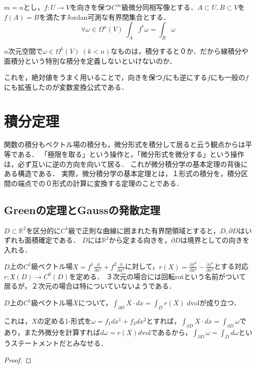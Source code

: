 \documentclass[uplatex, dvipdfmx]{jsreport}
\begin{document}
\begin{proposition}[変数変換公式]
    $m=n$とし，$f:U\to V$を向きを保つ$C^\infty$級微分同相写像とする．$A\subset U,B\subset V$を$f(A)=B$を満たすJordan可測な有界閉集合とする．
    \[ \forall \omega\in\Omega^n(V)\;\int_Af^*\omega = \int_B\omega \]
\end{proposition}
\begin{remark}
    $n$次元空間で$\omega\in\Omega^k(V)\;(k<n)$なものは，積分すると０か．だから線積分や面積分という特別な積分を定義しないといけないのか．

    これを，絶対値をうまく用いることで，向きを保つ$f$にも逆にする$f$にも一般の$f$にも拡張したのが変数変換公式である．
\end{remark}

\chapter{積分定理}
関数の積分もベクトル場の積分も，微分形式を積分して居ると云う観点からは平等である．
「極限を取る」という操作と，「微分形式を微分する」という操作は，必ず互いに逆の方向を向いて居る．
これが微分積分学の基本定理の背後にある構造である．
実際，微分積分学の基本定理とは，１形式の積分を，積分区間の端点での０形式の計算に変換する定理のことである．

\section{Greenの定理とGaussの発散定理}

$D\subset\mathbb{R}^2$を区分的に$C^1$級で正則な曲線に囲まれた有界閉領域とすると，$D,\partial D$はいずれも面積確定である．
$D$には$\mathbb{R}^2$から定まる向きを，$\partial D$は境界としての向きを入れる．

\begin{definition}
    $D$上の$C^1$級ベクトル場$X=f^1\frac{\partial}{\partial x^1}+f^2\frac{\partial}{\partial x^2}$に対して，$r(X)=\frac{\partial f^2}{\partial x^1}-\frac{\partial f^1}{\partial x^2}$とする対応$r:\mathfrak{X}(D)\to C^0(D)$を定める．
    ３次元の場合には回転rotという名前がついて居るが，２次元の場合は特についていないようである．
\end{definition}
\begin{shadebox}\begin{theorem}[Green]
    $D$上の$C^1$級ベクトル場$X$について，$\int_{\partial D}X\cdot dx=\int_Dr(X)\;d\mathrm{vol}$が成り立つ．

    これは，$X$の定める1-形式を$\omega=f_1dx^1+f_2dx^2$とすれば，$\int_{\partial D}X\cdot dx=\int_{\partial D}\omega$であり，また外微分を計算すれば$d\omega=r(X)d\mathrm{vol}$であるから，$\int_{\partial D}\omega=\int_Dd\omega$というステートメントだとみなせる．
\end{theorem}\end{shadebox}
\begin{proof}
    
\end{proof}
\end{document}
